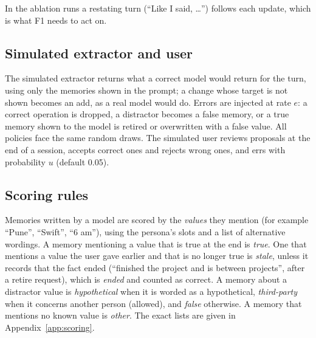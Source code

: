 \IfFileExists{IEEEtran.cls}{\documentclass[journal]{IEEEtran}\def\HAVEIEEE{1}}{\documentclass[10pt,twocolumn]{article}\usepackage[margin=0.7in,columnsep=0.25in]{geometry}}
\begin{document}
\begin{table}[t]
\centering\footnotesize
\caption{Persona 1 of the real-model runs: what the user says in each session, and the true state at the end.}
\label{tab:persona}

\end{table}

In the ablation runs a restating turn (``Like I said, \ldots'') follows each update, which is what F1 needs to act on.

\subsection{Simulated extractor and user}
The simulated extractor returns what a correct model would return for the turn, using only the memories shown in the prompt; a change whose target is not shown becomes an add, as a real model would do. Errors are injected at rate $e$: a correct operation is dropped, a distractor becomes a false memory, or a true memory shown to the model is retired or overwritten with a false value. All policies face the same random draws. The simulated user reviews proposals at the end of a session, accepts correct ones and rejects wrong ones, and errs with probability $u$ (default 0.05).

\subsection{Scoring rules}
Memories written by a model are scored by the \emph{values} they mention (for example ``Pune'', ``Swift'', ``6 am''), using the persona's slots and a list of alternative wordings. A memory mentioning a value that is true at the end is \emph{true}. One that mentions a value the user gave earlier and that is no longer true is \emph{stale}, unless it records that the fact ended (``finished the project and is between projects'', after a retire request), which is \emph{ended} and counted as correct. A memory about a distractor value is \emph{hypothetical} when it is worded as a hypothetical, \emph{third-party} when it concerns another person (allowed), and \emph{false} otherwise. A memory that mentions no known value is \emph{other}. The exact lists are given in Appendix~\ref{app:scoring}.
\end{document}
